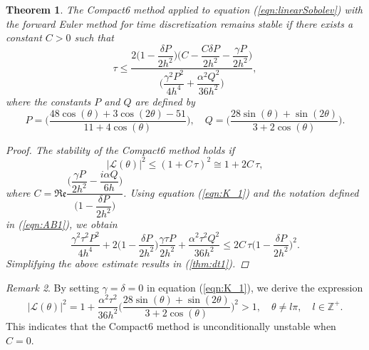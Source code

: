 \documentclass[11pt,a4paper]{amsart}
\theoremstyle{plain}
\newtheorem{theorem}{Theorem}[section]
\theoremstyle{definition}
\theoremstyle{remark}
\newtheorem{remark}[theorem]{Remark}
\numberwithin{equation}{section}
\begin{document}
\begin{theorem}\label{Thm:dt_estimate}
The Compact6 method applied to equation (\ref{eqn:linearSobolev}) with the forward Euler method for time discretization remains stable if there exists a constant $C > 0$ such that
\begin{equation}\label{thm:dt1}
    \tau \leq \dfrac{2\biggl( 1 - \dfrac{\delta P}{2 h^2}\biggr)\biggl( C - \dfrac{C\delta P}{2 h^2}- \dfrac{\gamma P}{2 h^2} \biggr)}{\biggl(\dfrac{ \gamma^2 P^2}{4 h^4} + \dfrac{\alpha^2 Q^2}{36 h^2}\biggr)},
\end{equation}
where the constants $P$ and $Q$ are defined by 
 \begin{equation}\label{eqn:AB1}
     P = \biggl(\dfrac{48 \cos(\theta) + 3 \cos(2\theta) - 51}{11+4 \cos(\theta)} \biggr), \quad Q = \biggl(\dfrac{28 \sin(\theta) + \sin(2\theta)}{3+2 \cos(\theta)} \biggr).
 \end{equation}
 \begin{proof}
     The stability of the Compact6 method holds if 
     \begin{equation}
         |\mathcal{L}(\theta)|^2 \leq (1 + C\, \tau)^2 \cong  1 + 2 C\, \tau,
     \end{equation}
where $C = \mathfrak{Re} \dfrac{\biggl(\dfrac{\gamma P}{2h^2} - \dfrac{i\alpha Q}{6h} \biggr)}{\biggl(1 - \dfrac{\delta P}{2 h^2}\biggr)}$. Using equation (\ref{eqn:K_1}) and the notation defined in (\ref{eqn:AB1}), we obtain
     \begin{equation}
         \dfrac{\gamma^2 \tau^2 P^2}{4 h^4} + 2 \biggl(1 - \dfrac{\delta P}{2 h^2}\biggr)\dfrac{\gamma \tau P}{2 h^2} + \dfrac{\alpha^2 \tau^2 Q^2}{36 h^2} \leq 2C\, \tau \biggl(1 - \dfrac{\delta P}{2 h^2}\biggr)^2.
     \end{equation}
     Simplifying the above estimate results in (\ref{thm:dt1}).
 \end{proof}
\end{theorem}


\begin{remark}\label{remark:1}
    By setting $\gamma = \delta =0$ in equation (\ref{eqn:K_1}), we derive the expression 
\begin{equation}
    |\mathcal{L}(\theta)|^2 = 1 + \dfrac{\alpha^2 \tau^2}{36 h^2} 
    \biggl(\dfrac{\displaystyle 28 \sin(\theta) + \sin(2\theta)}{\displaystyle 3+2 \cos(\theta)} \biggr)^2 > 1, 
    \quad \theta \neq l \pi, \quad l \in \mathbb{Z}^+.
\end{equation}
   This indicates that the Compact6 method is unconditionally unstable when $C = 0$. 
\end{remark}
\end{document}
